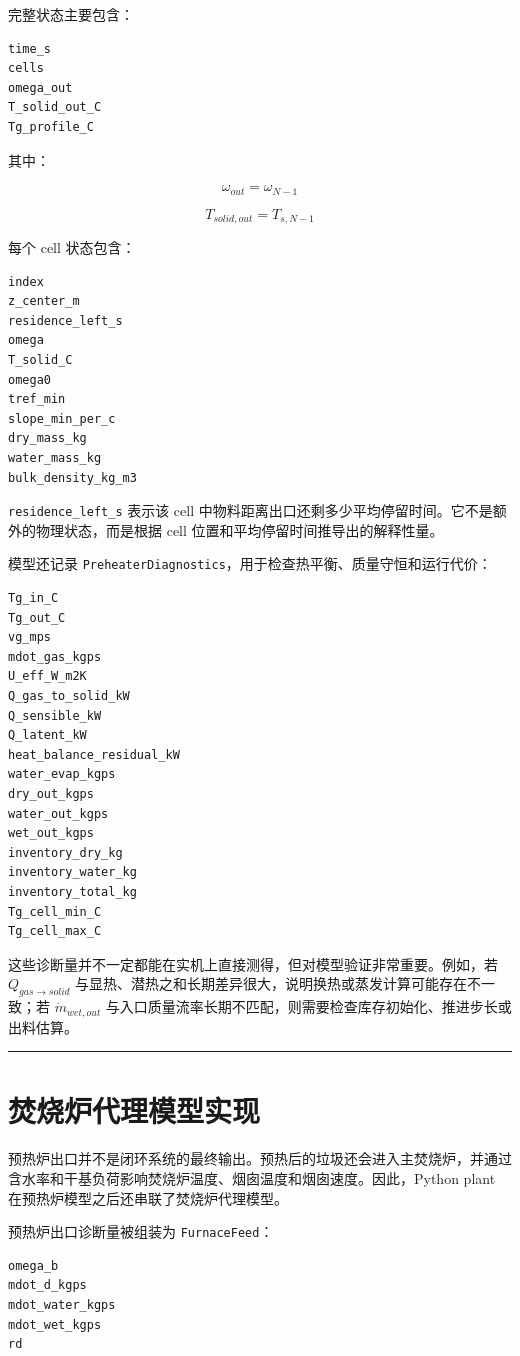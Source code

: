 \documentclass[UTF8,openany,zihao=-4,oneside]{ctexbook}
\providecommand{\passthrough}[1]{#1}
\newcommand{\manualdivider}{\par\vspace{0.6em}\noindent\textcolor{FGLine}{\rule{\linewidth}{0.7pt}}\vspace{0.6em}\par}
\begin{document}
完整状态主要包含：

\begin{lstlisting}
time_s
cells
omega_out
T_solid_out_C
Tg_profile_C
\end{lstlisting}

其中：

\[
\omega_{out}=\omega_{N-1}
\]

\[
T_{solid,out}=T_{s,N-1}
\]

每个 cell 状态包含：

\begin{lstlisting}
index
z_center_m
residence_left_s
omega
T_solid_C
omega0
tref_min
slope_min_per_c
dry_mass_kg
water_mass_kg
bulk_density_kg_m3
\end{lstlisting}

\passthrough{\lstinline!residence_left_s!} 表示该 cell 中物料距离出口还剩多少平均停留时间。它不是额外的物理状态，而是根据 cell 位置和平均停留时间推导出的解释性量。

模型还记录 \passthrough{\lstinline!PreheaterDiagnostics!}，用于检查热平衡、质量守恒和运行代价：

\begin{lstlisting}
Tg_in_C
Tg_out_C
vg_mps
mdot_gas_kgps
U_eff_W_m2K
Q_gas_to_solid_kW
Q_sensible_kW
Q_latent_kW
heat_balance_residual_kW
water_evap_kgps
dry_out_kgps
water_out_kgps
wet_out_kgps
inventory_dry_kg
inventory_water_kg
inventory_total_kg
Tg_cell_min_C
Tg_cell_max_C
\end{lstlisting}

这些诊断量并不一定都能在实机上直接测得，但对模型验证非常重要。例如，若 \(Q_{gas\to solid}\) 与显热、潜热之和长期差异很大，说明换热或蒸发计算可能存在不一致；若 \(\dot m_{wet,out}\) 与入口质量流率长期不匹配，则需要检查库存初始化、推进步长或出料估算。

\manualdivider

\section{焚烧炉代理模型实现}\label{ux711aux70e7ux7089ux4ee3ux7406ux6a21ux578bux5b9eux73b0}

预热炉出口并不是闭环系统的最终输出。预热后的垃圾还会进入主焚烧炉，并通过含水率和干基负荷影响焚烧炉温度、烟囱温度和烟囱速度。因此，Python plant 在预热炉模型之后还串联了焚烧炉代理模型。

预热炉出口诊断量被组装为 \passthrough{\lstinline!FurnaceFeed!}：

\begin{lstlisting}
omega_b
mdot_d_kgps
mdot_water_kgps
mdot_wet_kgps
rd
\end{lstlisting}
\end{document}
